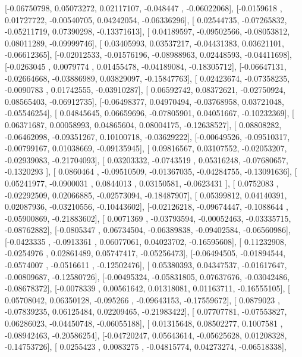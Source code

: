 \documentclass{article}
\begin{document}
       [-0.06750798,  0.05073272,  0.02117107, -0.048447  , -0.06022068],
       [-0.0159618 ,  0.01727722, -0.00540705,  0.04242054, -0.06336296],
       [ 0.02544735, -0.07265832, -0.05211719,  0.07390298, -0.13371613],
       [ 0.04189597, -0.09502566, -0.08053812,  0.08011289, -0.09999746],
       [ 0.03405993,  0.03537217, -0.04431383,  0.03621101, -0.06612365],
       [-0.02012533, -0.01576196, -0.08988963,  0.02448593, -0.04411698],
       [-0.0263045 ,  0.0079774 ,  0.01455478, -0.04189084, -0.18305712],
       [-0.06647131, -0.02664668, -0.03886989,  0.03829097, -0.15847763],
       [ 0.02423674, -0.07358235, -0.0090783 ,  0.01742555, -0.03910287],
       [ 0.06592742,  0.08372621, -0.02750924,  0.08565403, -0.06912735],
       [-0.06498377,  0.04970494, -0.03768958,  0.03721048, -0.05546254],
       [ 0.04845645,  0.06659696, -0.07805901,  0.04051667, -0.10232369],
       [ 0.06371687,  0.00058993,  0.04865604,  0.08004175, -0.12638527],
       [ 0.08808282, -0.06462098, -0.09351267,  0.10100718, -0.03629222],
       [-0.00649526, -0.09510317, -0.00799167,  0.01038669, -0.09135945],
       [ 0.09816567,  0.03107552, -0.02053207, -0.02939083, -0.21704093],
       [ 0.03203332, -0.0743519 ,  0.05316248, -0.07680657, -0.1320293 ],
       [ 0.0860464 , -0.09510509, -0.01367035, -0.04284755, -0.13091636],
       [ 0.05241977, -0.0900031 ,  0.0844013 ,  0.03150581, -0.0623431 ],
       [ 0.0752083 , -0.02292509,  0.02066885, -0.02573094, -0.18487907],
       [ 0.05399812,  0.04140391,  0.02087936, -0.03210556, -0.10443602],
       [-0.02126218, -0.09674447, -0.1088644 , -0.05900869, -0.21883602],
       [ 0.0071369 , -0.03793594, -0.00052463, -0.03335715, -0.08762882],
       [-0.0805347 ,  0.06734504, -0.06389838, -0.09402584, -0.06560986],
       [-0.0423335 , -0.0913361 ,  0.06077061,  0.04023702, -0.16595608],
       [ 0.11232908, -0.0254976 ,  0.02861489,  0.05747417, -0.05256473],
       [-0.06494505, -0.01894544, -0.0574007 , -0.0516611 , -0.12502476],
       [ 0.05380393,  0.04347537, -0.01617647, -0.00809687, -0.12580726],
       [-0.00495324, -0.05831805,  0.07637676, -0.03042486, -0.08678372],
       [-0.0078339 ,  0.00561642,  0.01318081,  0.01163711, -0.16555105],
       [ 0.05708042,  0.06350128, -0.095266  , -0.09643153, -0.17559672],
       [ 0.0879023 , -0.07839235,  0.06125484,  0.02209465, -0.21983422],
       [ 0.07707781, -0.07553827,  0.06286023, -0.04450748, -0.06055188],
       [ 0.01315648,  0.08502277,  0.1007581 , -0.08942463, -0.20586254],
       [-0.04720247,  0.05643614, -0.05625628,  0.01208328, -0.14753726],
       [ 0.0255423 ,  0.0083275 , -0.04815774,  0.04273274, -0.06518338],
\end{document}
